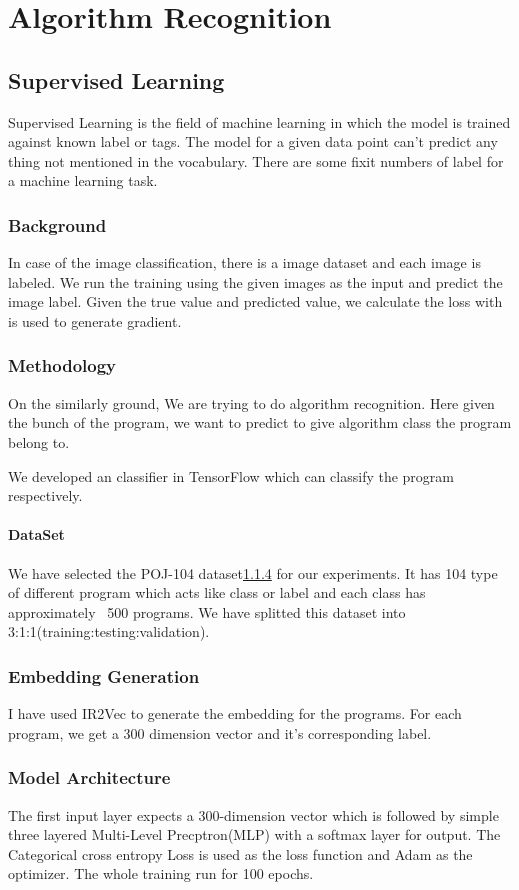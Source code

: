 \chapter{Algorithm Recognition}
\label{chap:ch3}

\section{Supervised Learning}
Supervised Learning is the field of machine learning in which the model is trained against known label or tags. The model for a given data point can't predict any thing not mentioned in the vocabulary. There are some fixit numbers of label for a machine learning task.

\subsection{Background}
In case of the image classification, there is a image dataset and each image is labeled. We run the training using the given images as the input and predict the image label. Given the true value and predicted value, we calculate the loss with is used to generate gradient.

\subsection{Methodology}
On the similarly ground, We are trying to do algorithm recognition. Here given the bunch of the program, we want to predict to give algorithm class the program belong to.

We developed an classifier in TensorFlow which can classify the program respectively. 
\subsubsection{DataSet}
We have selected the POJ-104 dataset\ref{} for our experiments. It has 104 type of different program which acts like class or label and each class has approximately ~500 programs. We have splitted this dataset into 3:1:1(training:testing:validation).

\subsection{Embedding Generation}
I have used IR2Vec to generate the embedding for the programs. For each program, we get a 300 dimension vector and it's corresponding label.

\subsection{Model Architecture}
The first input layer expects a 300-dimension vector which is followed by simple three layered Multi-Level Precptron(MLP) with a softmax layer for output. The Categorical cross entropy Loss is used as the loss function and Adam as the optimizer. The whole training run for 100 epochs.

